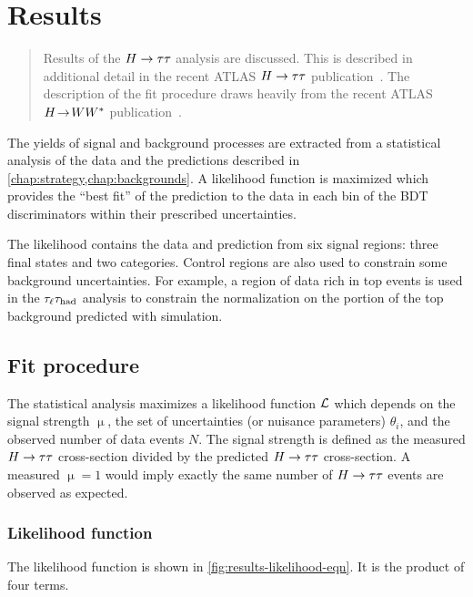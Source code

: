 \chapter[Results][Results]{Results}
\label{chap:results}

\begin{quote}
  Results of the $H\rightarrow\tau\tau$ analysis are discussed. This is described in additional detail in the recent ATLAS $H\rightarrow\tau\tau$ publication~\cite{HIGG-2013-32}. The description of the fit procedure draws heavily from the recent ATLAS $H \!\rightarrow\! WW^\ast$ publication~\cite{HIGG-2013-13}.
\end{quote}

The yields of signal and background processes are extracted from a statistical analysis of the data and the predictions described in \cref{chap:strategy,chap:backgrounds}. A likelihood function is maximized which provides the ``best fit'' of the prediction to the data in each bin of the BDT discriminators within their prescribed uncertainties.

The likelihood contains the data and prediction from six signal regions: three final states and two categories. Control regions are also used to constrain some background uncertainties. For example, a region of data rich in top events is used in the $\tau_\ell\tau_\text{had}$ analysis to constrain the normalization on the portion of the top background predicted with simulation.

\section{Fit procedure}
\label{sec:results-fit-procedure}

The statistical analysis maximizes a likelihood function $\mathcal{L}$ which depends on the signal strength $\upmu$, the set of uncertainties (or nuisance parameters) $\theta_i$, and the observed number of data events $N$. The signal strength is defined as the measured $H\rightarrow\tau\tau$ cross-section divided by the predicted $H\rightarrow\tau\tau$ cross-section. A measured $\upmu=1$ would imply exactly the same number of $H\rightarrow\tau\tau$ events are observed as expected.

\subsection{Likelihood function}

The likelihood function is shown in \cref{fig:results-likelihood-eqn}. It is the product of four terms.
%

